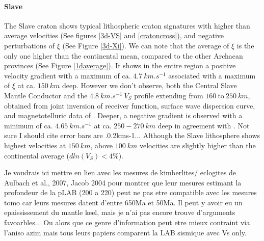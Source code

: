 \documentclass[12pt]{article}
\begin{document}
		\paragraph{Slave}
			The Slave craton shows typical lithospheric craton signatures with higher than average velocities (See figures \ref{3d-VS} and \ref{cratoncross}), and negative perturbations of $\xi$ (See Figure \ref{3d-Xi}). 
			We can note that the average of $\xi$ is the only one higher than the continental mean, compared to the other Archaean provinces (See Figure \ref{1daverage}).
			It shows in the entire region a positive velocity gradient with a maximum of ca. $4.7 \: km.s^{-1}$ associated with a maximum of $\xi$ at ca. $150 \: km$ deep. However we don't observe, both the Central Slave Mantle Conductor and the $4.8 \: km.s^{-1} \: V_S$ profile extending from $160 \: \text{to} \: 250 \: km$, obtained from joint inversion of receiver function, surface wave dispersion curve, and magnetotelluric data of \cite{moorkamp2010joint}. 
			Deeper, a negative gradient is observed with a minimum of ca. $4.65 \: km.s^{-1}$ at ca. $250 - 270\: km$ deep in agreement with \cite{chen2007new}. Not sure I should cite error bars are .0.2kms-1...
			Although the Slave lithosphere shows highest velocities at $150 \: km$, above $100 \: km$ velocities are slightly higher than the continental average ($dln(V_S)< 4\%$). 

			Je voudrais ici mettre en lien avec les mesures de kimberlites/ eclogites de \cite{faure2011seismic,heaman2003timing} Aulbach et al., 2007, Jacob 2004 pour montrer que leur mesures estimant la profondeur de la pLAB (200 a 220) peut ne pas etre compatible avec les mesures tomo car leurs mesures datent d'entre 650Ma et 50Ma. Il peut y avoir eu un epaississement du mantle keel, mais je n'ai pas encore trouve d'arguments favoarbles... Ou alors que ce genre d'information peut etre mieux contraint via l'aniso azim mais tous leurs papiers comparent la LAB sismique avec Vs only.
\end{document}
